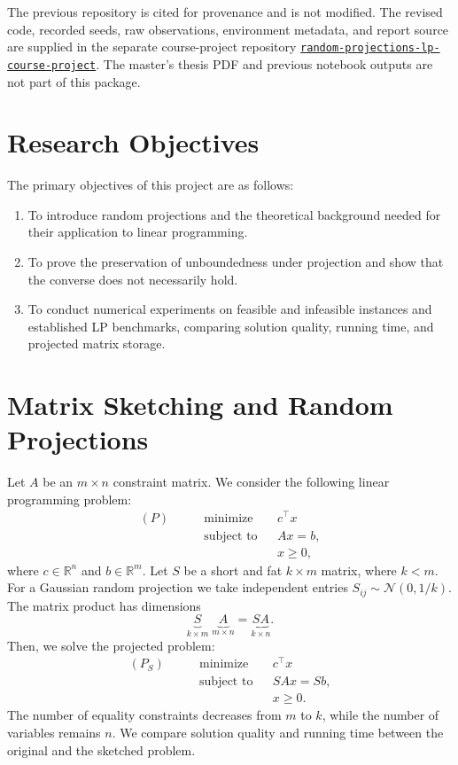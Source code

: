 \documentclass[12pt,letterpaper,oneside]{report}
\theoremstyle{definition}
\newcommand{\R}{\mathbb{R}}
\begin{document}
The previous repository is cited for provenance and is not modified.
The revised code, recorded seeds, raw observations, environment metadata,
and report source are supplied in the separate course-project repository
\href{https://github.com/Jamil997/random-projections-lp-course-project}{\texttt{random-projections-lp-course-project}}. The master's thesis PDF
and previous notebook outputs are not part of this package.

\section{Research Objectives}
The primary objectives of this project are as follows:
\begin{enumerate}[label=\arabic*)]
\item To introduce random projections and the theoretical background
needed for their application to linear programming.
\item To prove the preservation of unboundedness under projection and
show that the converse does not necessarily hold.
\item To conduct numerical experiments on feasible and infeasible
instances and established LP benchmarks, comparing solution quality,
running time, and projected matrix storage.
\end{enumerate}

\section{Matrix Sketching and Random Projections}
Let $A$ be an $m\times n$ constraint matrix. We consider the following
linear programming problem:
\begin{equation}\label{eq:original}
\begin{aligned}
(P)\qquad &\text{minimize} &&c^\top x\\
&\text{subject to} &&Ax=b,\\
&&&x\geq0,
\end{aligned}
\end{equation}
where $c\in\R^n$ and $b\in\R^m$.
Let $S$ be a short and fat $k\times m$ matrix, where $k<m$. For a
Gaussian random projection we take independent entries
$S_{ij}\sim\mathcal{N}(0,1/k)$. The matrix product has dimensions
\[
\underbrace{S}_{k\times m}\;
\underbrace{A}_{m\times n}
=\underbrace{SA}_{k\times n}.
\]
Then, we solve the projected problem:
\begin{equation}\label{eq:projected}
\begin{aligned}
(P_S)\qquad &\text{minimize} &&c^\top x\\
&\text{subject to} &&SAx=Sb,\\
&&&x\geq0.
\end{aligned}
\end{equation}
The number of equality constraints decreases from $m$ to $k$, while the
number of variables remains $n$. We compare solution quality and running
time between the original and the sketched problem.
\end{document}
